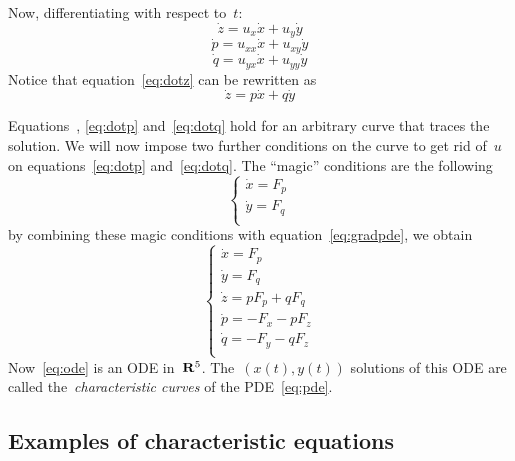 Now, differentiating with respect to~$t$:
\begin{equation}\label{eq:dotz}
	\dot z=u_x\dot x + u_y\dot y
\end{equation}
\begin{equation}\label{eq:dotp}
	\dot p=u_{xx}\dot x + u_{xy}\dot y
\end{equation}
\begin{equation}\label{eq:dotq}
	\dot q=u_{yx}\dot x + u_{yy}\dot y
\end{equation}
Notice that equation~\eqref{eq:dotz} can be rewritten as
\begin{equation}\label{eq:dotz2}\dot z=p\dot x+q\dot y\end{equation}

Equations~\label{eq:dotz2}, \eqref{eq:dotp} and~\eqref{eq:dotq} hold for an
arbitrary curve that traces the solution.  We will now impose two further
conditions on the curve to get rid of~$u$ on equations~\eqref{eq:dotp}
and~\eqref{eq:dotq}.  The ``magic'' conditions are the following
\begin{equation}
	\begin{cases}
		\dot x = F_p \\
		\dot y = F_q \\
	\end{cases}
\end{equation}
by combining these magic conditions with equation~\eqref{eq:gradpde}, we obtain
\begin{equation}\label{eq:ode}
	\begin{cases}
		\dot x = F_p \\
		\dot y = F_q \\
		\dot z = pF_p + qF_q \\
		\dot p = -F_x - pF_z \\
		\dot q = -F_y - qF_z \\
	\end{cases}
\end{equation}
Now~\eqref{eq:ode} is an ODE in~$\mathbf{R}^5$.  The~$\left(x(t),y(t)\right)$ solutions
of this ODE are called the~\emph{characteristic curves} of the
PDE~\eqref{eq:pde}.

\subsection{Examples of characteristic equations}

